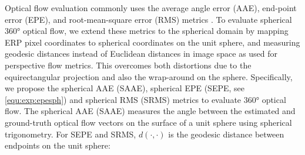 Optical flow evaluation commonly uses the average angle error (AAE), end-point error (EPE), and root-mean-square error (RMS) metrics \cite{BakerSLRBS2011}.
%
To evaluate spherical 360° optical flow, we extend these metrics to the spherical domain by mapping ERP pixel coordinates to spherical coordinates on the unit sphere, and measuring geodesic distances instead of Euclidean distances in image space as used for perspective flow metrics.
This overcomes both distortions due to the equirectangular projection and also the wrap-around on the sphere.
%
%
Specifically, we propose the spherical AAE (SAAE), spherical EPE (SEPE, see \cref{equ:exp:epesph}) and spherical RMS (SRMS) metrics to evaluate 360° optical flow.
The spherical AAE (SAAE) measures the angle between the estimated and ground-truth optical flow vectors on the surface of a unit sphere using spherical trigonometry.
%
For SEPE and SRMS, $d(\cdot, \cdot)$ is the geodesic distance between endpoints on the unit sphere:
